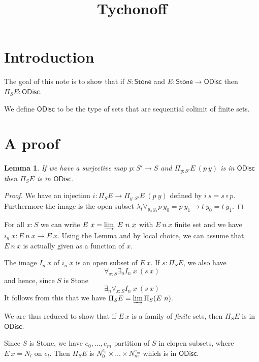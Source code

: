 \documentclass[10pt,a4paper]{article}
\newtheorem{lemma}{Lemma}[section]
\newcommand{\ODisc}{\mathsf{ODisc}}
\newcommand{\Stone}{\mathsf{Stone}}
\begin{document}
\title{Tychonoff}

\author{}
\date{}
\maketitle


\section*{Introduction}

The goal of this note is to show that if $S:\Stone$ and $E:\Stone\rightarrow\ODisc$
then $\Pi_SE:\ODisc$.

We define $\ODisc$ to be the type of sets that are sequential colimit of finite sets.

\section{A proof}

\begin{lemma}
  If we have a surjective map $p:S'\rightarrow S$ and $\Pi_{y:S'}E~(p~y)$ is in $\ODisc$
  then $\Pi_SE$ is in $\ODisc$.
\end{lemma}

\begin{proof}
  We have an injection $i:\Pi_SE\rightarrow \Pi_{y:S'}E~(p~y)$ defined by $i~s = s\circ p$.
  Furthermore the image is the open subset $\lambda_t\forall_{y_0~y_1}p~y_0=p~y_1\rightarrow t~y_0 = t~y_1$.
\end{proof}

\medskip

For all $x:S$ we can write $E~x = \varinjlim ~E~n~x$ with $E~n~x$ finite set and we have
$i_n~x : E~n~x\rightarrow E~x$. Using the Lemma and by local choice, we can assume that $E~n~x$ is actually
given as a function of $x$.

The image $I_n~x$ of $i_n~x$ is an open subset of $E~x$. If $s:\Pi_SE$, we also have
$$
\forall_{x:S}\exists_n I_n~x~(s~x)
$$
and hence, since $S$ is Stone
$$
\exists_n\forall_{x:S} I_n~x~(s~x)
$$
It follows from this that we have $\Pi_SE = \varinjlim \Pi_S(E~n)$.

\medskip

We are thus reduced to show that if $E~x$ is a family of {\em finite} sets, then $\Pi_SE$ is in $\ODisc$.

Since $S$ is Stone, we have $e_0,\dots,e_m$ partition of $S$ in clopen subsets, where $E~x = N_l$ on $e_l$.
Then $\Pi_SE$ is $N_0^{e_0}\times \dots \times N_m^{e_m}$ which is in $\ODisc.$
\end{document}
